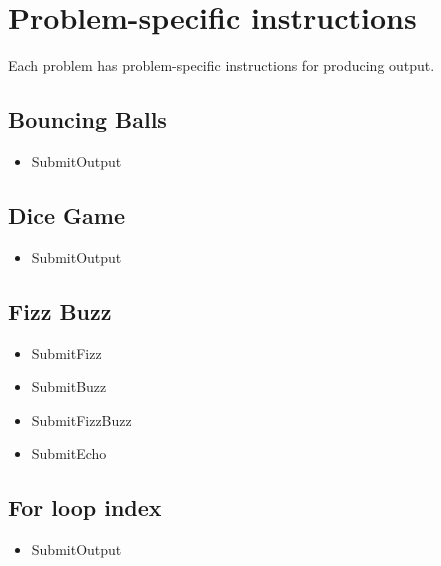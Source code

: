 \documentclass[
]{book}
\providecommand{\tightlist}{%
  \setlength{\itemsep}{0pt}\setlength{\parskip}{0pt}}
\begin{document}
\hypertarget{problem-specific-instructions}{%
\section{Problem-specific instructions}\label{problem-specific-instructions}}

Each problem has problem-specific instructions for producing output.

\hypertarget{bouncing-balls}{%
\subsection{Bouncing Balls}\label{bouncing-balls}}

\begin{itemize}
\tightlist
\item
  SubmitOutput
\end{itemize}

\hypertarget{dice-game}{%
\subsection{Dice Game}\label{dice-game}}

\begin{itemize}
\tightlist
\item
  SubmitOutput
\end{itemize}

\hypertarget{fizz-buzz}{%
\subsection{Fizz Buzz}\label{fizz-buzz}}

\begin{itemize}
\tightlist
\item
  SubmitFizz
\item
  SubmitBuzz
\item
  SubmitFizzBuzz
\item
  SubmitEcho
\end{itemize}

\hypertarget{for-loop-index}{%
\subsection{For loop index}\label{for-loop-index}}

\begin{itemize}
\tightlist
\item
  SubmitOutput
\end{itemize}
\end{document}
